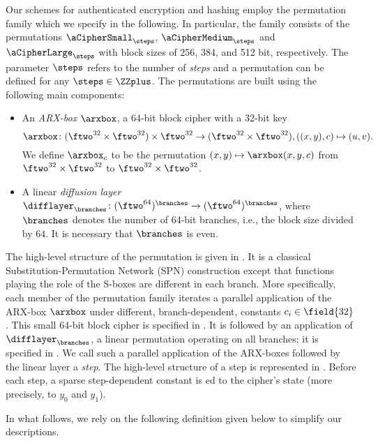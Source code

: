 
Our schemes for authenticated encryption and hashing employ the permutation family \aCipher{} which we specify in the following. In particular, the \aCipher{} family consists of the permutations $\aCipherSmall_{\steps}$, $\aCipherMedium_{\steps}$ and $\aCipherLarge_{\steps}$ with block sizes of 256, 384, and 512 bit, respectively. The parameter $\steps$ refers to the number of \emph{steps} and a permutation can be defined for any $\steps \in \ZZplus$. The permutations are built using the following main components:
\begin{itemize}
    \item An \emph{ARX-box} $\arxbox$, a 64-bit block cipher with a 32-bit key \[\arxbox \colon (\ftwo^{32} \times \ftwo^{32}) \times \ftwo^{32} \rightarrow (\ftwo^{32} \times \ftwo^{32}), ((x,y),c) \mapsto (u,v).\]
    We define $\arxbox_{c}$ to be the permutation $(x,y) \mapsto \arxbox(x,y,c)$ from $\ftwo^{32} \times \ftwo^{32}$ to $ \ftwo^{32} \times \ftwo^{32}$.
    
    \item A linear \emph{diffusion layer} $\mathcal \difflayer_{\branches} \colon (\ftwo^{64})^{\branches} \rightarrow (\ftwo^{64})^{\branches}$, where $\branches$ denotes the number of 64-bit branches, i.e., the block size divided by $64$. It is necessary that $\branches$ is even.
\end{itemize}

The high-level structure of the permutation is given in . It is a classical Substitution-Permutation Network (SPN) construction except that functions playing the role of the S-boxes are different in each branch. More specifically, each member of the permutation family iterates a parallel application of the ARX-box $\arxbox$ under different, branch-dependent, constants $c_i \in \field{32}$. This small 64-bit block cipher is specified in . It is followed by an application of $\difflayer_{\branches}$, a linear permutation operating on all branches; it is specified in . We call such a parallel application of the ARX-boxes followed by the linear layer a \emph{step}. The high-level structure of a step is represented in . Before each step, a sparse step-dependent constant is \txor{}ed to the cipher's state (more precisely, to $y_0$ and $y_1$). 

In what follows, we rely on the following definition given below to simplify our descriptions.

